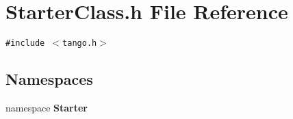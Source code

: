 \section{Starter\-Class.h File Reference}
\label{StarterClass_8h}
{\tt \#include $<$tango.h$>$}\par
\subsection*{Namespaces}
\begin{CompactItemize}
\item 
namespace {\bf Starter}
\end{CompactItemize}
